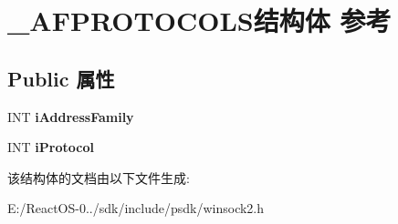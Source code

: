 \hypertarget{struct___a_f_p_r_o_t_o_c_o_l_s}{}\section{\+\_\+\+A\+F\+P\+R\+O\+T\+O\+C\+O\+L\+S结构体 参考}
\label{struct___a_f_p_r_o_t_o_c_o_l_s}
\subsection*{Public 属性}
\begin{DoxyCompactItemize}
\item 
\mbox{\label{struct___a_f_p_r_o_t_o_c_o_l_s_a9586db28fe962e2130dc9b94b8001593}} 
I\+NT {\bfseries i\+Address\+Family}
\item 
\mbox{\label{struct___a_f_p_r_o_t_o_c_o_l_s_aac12394e7110af135a0765c190b3b83b}} 
I\+NT {\bfseries i\+Protocol}
\end{DoxyCompactItemize}


该结构体的文档由以下文件生成\+:\begin{DoxyCompactItemize}
\item 
E\+:/\+React\+O\+S-\/0../sdk/include/psdk/winsock2.\+h\end{DoxyCompactItemize}
